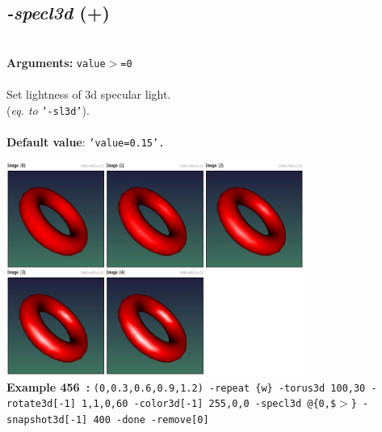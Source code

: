 \documentclass[a4paper,11pt,twoside]{book}
\begin{document}
\subsection{\emph{-specl3d} (+)}\vspace*{-0.5em}
~\\\textbf{Arguments: } 
{\small \texttt{value$>$=0}}\\~\\
Set lightness of 3d specular light.
~\\(\emph{eq. to} {\small \texttt{'-sl3d'}}).
~\\~\\\textbf{Default value}: {\small \texttt{'value=0.15'.}}
\begin{center}\includegraphics[keepaspectratio=true,height=7cm,width=\textwidth]{img/gmic_def456.jpg}\\
{\footnotesize \textbf{Example 456~:} \texttt{(0,0.3,0.6,0.9,1.2) -repeat \{w\} -torus3d 100,30 -rotate3d[-1] 1,1,0,60 -color3d[-1] 255,0,0 -specl3d @\{0,\$$>$\} -snapshot3d[-1] 400 -done -remove[0]}}
\end{center}
\end{document}
